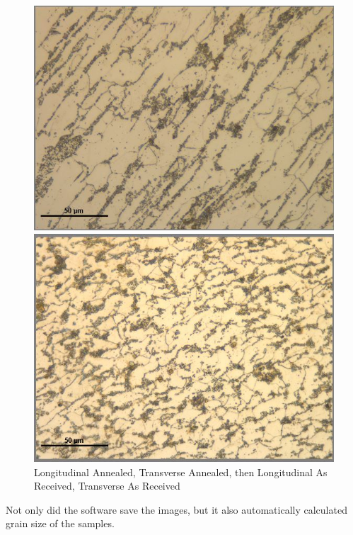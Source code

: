 \documentclass{article}
\begin{document}
\begin{figure}[h]
\begin{minipage}{0.5\textwidth}
	\end{minipage}\\
	\begin{minipage}{0.5\textwidth}
		\centering
		\includegraphics[scale=.46]{LARSteelGrains.jpg}
	\end{minipage}
	\begin{minipage}{0.5\textwidth}
		\centering
		\includegraphics[scale=.46]{TARSteelGrains.jpg}
	\end{minipage}
	\caption{Longitudinal Annealed, Transverse Annealed, then Longitudinal As Received, Transverse As Received}
\end{figure}

Not only did the software save the images, but it also automatically calculated grain size of the samples.
\end{document}
